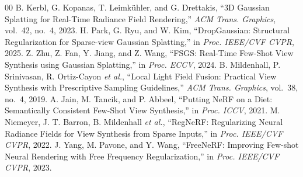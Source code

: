 \documentclass[conference]{IEEEtran}
\begin{document}
\begin{thebibliography}{00}
 B. Kerbl, G. Kopanas, T. Leimk\"uhler, and G. Drettakis,
``3D Gaussian Splatting for Real-Time Radiance Field Rendering,'' \textit{ACM Trans.
Graphics}, vol.~42, no.~4, 2023.
 H. Park, G. Ryu, and W. Kim, ``DropGaussian: Structural
Regularization for Sparse-view Gaussian Splatting,'' in \textit{Proc. IEEE/CVF CVPR},
2025.
 Z. Zhu, Z. Fan, Y. Jiang, and Z. Wang, ``FSGS: Real-Time Few-Shot
View Synthesis using Gaussian Splatting,'' in \textit{Proc. ECCV}, 2024.
 B. Mildenhall, P. Srinivasan, R. Ortiz-Cayon
\textit{et al.}, ``Local Light Field Fusion: Practical View Synthesis with Prescriptive
Sampling Guidelines,'' \textit{ACM Trans. Graphics}, vol.~38, no.~4, 2019.
 A. Jain, M. Tancik, and P. Abbeel, ``Putting NeRF on a Diet:
Semantically Consistent Few-Shot View Synthesis,'' in \textit{Proc. ICCV}, 2021.
 M. Niemeyer, J. T. Barron, B. Mildenhall \textit{et al.},
``RegNeRF: Regularizing Neural Radiance Fields for View Synthesis from Sparse Inputs,''
in \textit{Proc. IEEE/CVF CVPR}, 2022.
 J. Yang, M. Pavone, and Y. Wang, ``FreeNeRF: Improving
Few-shot Neural Rendering with Free Frequency Regularization,'' in \textit{Proc.
IEEE/CVF CVPR}, 2023.
\end{thebibliography}
\end{document}
